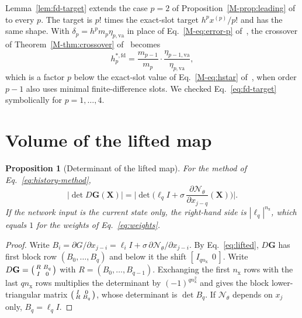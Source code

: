\documentclass[11pt]{article}
\newcommand{\Mref}[1]{\ref{M-#1} of~\cite{main}}
\newcommand{\Meqref}[1]{Eq.~\eqref{M-#1} of~\cite{main}}
\newtheorem{proposition}{Proposition}
\theoremstyle{definition}
\theoremstyle{remark}
\newcommand{\Net}{\mathcal{N}_\theta}
\newcommand{\va}{\mathrm{va}}
\newcommand{\bX}{\mathbf{X}}
\newcommand{\bG}{\mathbf{G}}
\begin{document}
Lemma~\ref{lem:fd-target} extends the case $p = 2$ of Proposition~\Mref{prop:leading} to every $p$.
The target is $p!$ times the exact-slot target $h^px^{(p)}/p!$ and has the same shape.
With $\delta_p = h^pm_p\eta_{p,\va}$ in place of Eq.~\eqref{M-eq:error-p} of~\cite{main}, the crossover of Theorem~\Mref{thm:crossover} becomes
\begin{equation}\label{eq:hstar-fd}
h_p^{\ast,\mathrm{fd}} = \frac{m_{p-1}}{m_p}\cdot\frac{\eta_{p-1,\va}}{\eta_{p,\va}},
\end{equation}
which is a factor $p$ below the exact-slot value of \Meqref{eq:hstar}, when order $p-1$ also uses minimal finite-difference slots.
We checked Eq.~\eqref{eq:fd-target} symbolically for $p = 1, \dots, 4$.

\section{Volume of the lifted map}\label{sec:volume}

\begin{proposition}[Determinant of the lifted map]\label{prop:det}
For the method of Eq.~\eqref{eq:history-method},
\begin{equation}\label{eq:det}
\big|\det D\bG(\bX)\big| = \Big|\det\Big(\ell_q I + \sigma\,\frac{\partial\Net}{\partial x_{j-q}}(\bX)\Big)\Big| .
\end{equation}
If the network input is the current state only, the right-hand side is $|\ell_q|^{n_{\mathrm x}}$, which equals $1$ for the weights of Eq.~\eqref{eq:weights}.
\end{proposition}

\begin{proof}
Write $B_i = \partial G/\partial x_{j-i} = \ell_iI + \sigma\,\partial\Net/\partial x_{j-i}$.
By Eq.~\eqref{eq:lifted}, $D\bG$ has first block row $(B_0, \dots, B_q)$ and below it the shift $[\,I_{qn_{\mathrm x}}\ \ 0\,]$.
Write $D\bG = \begin{psmallmatrix} R & B_q \\ I & 0\end{psmallmatrix}$ with $R = (B_0, \dots, B_{q-1})$.
Exchanging the first $n_{\mathrm x}$ rows with the last $qn_{\mathrm x}$ rows multiplies the determinant by $(-1)^{qn_{\mathrm x}^2}$ and gives the block lower-triangular matrix $\begin{psmallmatrix} I & 0 \\ R & B_q\end{psmallmatrix}$, whose determinant is $\det B_q$.
If $\Net$ depends on $x_j$ only, $B_q = \ell_qI$.
\end{proof}
\end{document}
